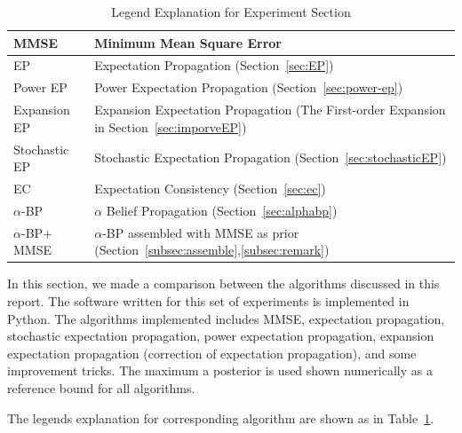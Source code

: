 \documentclass{article}
\begin{document}
\begin{table}[!t]
  \caption{Legend Explanation for Experiment Section}\label{tab:lagend}
  \centering
  \begin{tabular}{ |p{3cm}||p{8cm}|  }
    \hline
    MMSE   & Minimum Mean Square Error \\
    \hline
    EP   & Expectation Propagation (Section~\ref{sec:EP}) \\
    \hline
    Power EP & Power Expectation Propagation (Section~\ref{sec:power-ep}) \\
    \hline
    Expansion EP & Expansion Expectation Propagation (The First-order Expansion in Section~\ref{sec:imporveEP}) \\
    Stochastic EP & Stochastic Expectation Propagation (Section~\ref{sec:stochasticEP}) \\
    \hline
    EC & Expectation Consistency (Section~\ref{sec:ec}) \\
    \hline
    $\alpha$-BP & $\alpha$ Belief Propagation (Section~\ref{sec:alphabp}) \\
    \hline
    $\alpha$-BP$+$MMSE & $\alpha$-BP assembled with MMSE as prior (Section~\ref{subsec:assemble},\ref{subsec:remark}) \\
    \hline
  \end{tabular}
  \vspace{1cm}
\end{table}


In this section, we made a comparison between the algorithms discussed in this report. The software written for this set of experiments is implemented in Python. The algorithms implemented includes MMSE, expectation propagation, stochastic expectation propagation, power expectation propagation, expansion expectation propagation (correction of expectation propagation), and some improvement tricks. The maximum a posterior is used shown numerically as a reference bound for all algorithms.

The legends explanation for corresponding algorithm are shown as in Table~\ref{tab:lagend}.

\newpage


\end{document}

